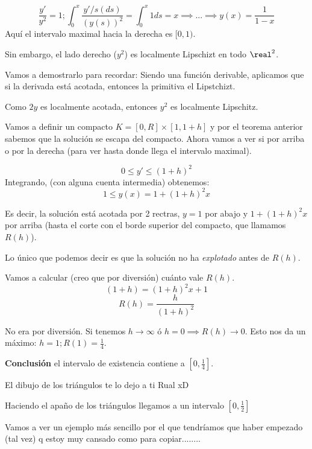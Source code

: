 \documentclass{mathnotes}
\begin{document}
\[\frac{y'}{y^2} = 1 ; \int_0^x \frac{y'/s(ds)}{(y(s))^2} = \int_0^x 1ds = x \implies ... \implies y(x) = \frac{1}{1-x}\]
Aquí el intervalo maximal hacia la derecha es $[0,1)$.

Sin embargo, el lado derecho ($y^2$) es localmente Lipschizt en todo $\real^2$.

Vamos a demostrarlo para recordar: Siendo una función derivable, aplicamos que si la derivada está acotada, entonces la primitiva el Lipstchizt. 

Como $2y$ es localmente acotada, entonces $y^2$ es localmente Lipschitz.

Vamos a definir un compacto $K = [0,R]×[1,1+h]$ y por el teorema anterior sabemos que la solución se escapa del compacto. Ahora vamos a ver si por arriba o por la derecha (para ver hasta donde llega el intervalo maximal).

\[0\leq y' \leq (1+h)^2\]
Integrando, (con alguna cuenta intermedia) obtenemos:
\[1\leq y (x) = 1 + (1+h)^2 x\]

Es decir, la solución está acotada por 2 rectras, $y=1$ por abajo y $1 + (1+h)^2 x$ por arriba (hasta el corte con el borde superior del compacto, que llamamos $R(h)$).

Lo único que podemos decir es que la solución no ha \textit{explotado} antes de $R(h)$.

Vamos a calcular (creo que por diversión) cuánto vale $R(h)$.
\[(1+h) = (1+h)^2x+1\]
\[R(h) = \frac{h}{(1+h)^2}\]


No era por diversión. Si tenemos $h\to \infty$ ó $h=0 \implies R(h) \to 0$. Esto nos da un máximo: $h=1; R(1)=\frac{1}{4}$.

\textbf{Conclusión} el intervalo de existencia contiene a $\left[0,\frac{1}{4}\right]$.

El dibujo de los triángulos te lo dejo a ti Rual xD

Haciendo el apaño de los triángulos llegamos a un intervalo $\left[0,\frac{1}{2}\right]$

Vamos a ver un ejemplo más sencillo por el que tendríamos que haber empezado (tal vez) q estoy muy cansado como para copiar........

\end{document}
